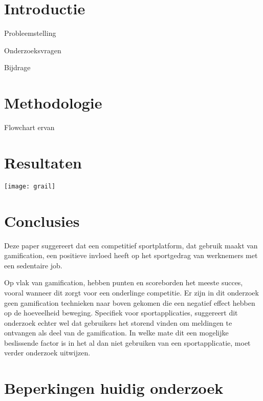 \documentclass[a0,portrait]{hogent-poster}
\begin{document}
\begin{multicols}{2} %

\section{Introductie}

Probleemstelling

Onderzoeksvragen

Bijdrage

\section{Methodologie}

Flowchart ervan

\section{Resultaten}

\begin{center}
  \captionsetup{type=figure}
  \texttt{[image: grail]}
\end{center}

\section{Conclusies}

Deze paper suggereert dat een competitief sportplatform, dat gebruik maakt van
gamification, een positieve invloed heeft op het sportgedrag van werknemers met een sedentaire job.

Op vlak van gamification, hebben punten en scoreborden het meeste succes, vooral wanneer dit zorgt voor een onderlinge competitie. Er zijn in dit onderzoek geen gamification technieken naar boven gekomen die een negatief effect hebben op de hoeveelheid beweging. Specifiek voor sportapplicaties, suggereert dit onderzoek echter wel dat gebruikers het storend vinden om meldingen te ontvangen als deel van de gamification. In welke mate dit een mogelijke beslissende factor is in het al dan niet gebruiken van een sportapplicatie, moet verder onderzoek uitwijzen.

\section{Beperkingen huidig onderzoek}


\end{multicols}
\end{document}
